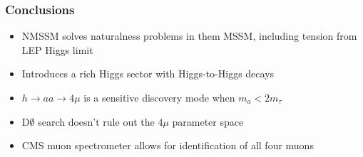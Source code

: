 \documentclass[compress]{beamer}
\begin{document}


\begin{frame}
\frametitle{Conclusions}

\begin{itemize}\setlength{\itemsep}{0.5 cm}
\item NMSSM solves naturalness problems in them MSSM, including tension from LEP Higgs limit
\item Introduces a rich Higgs sector with Higgs-to-Higgs decays
\item $h \to aa \to 4\mu$ is a sensitive discovery mode when $m_a < 2m_\tau$
\item D$\emptyset$ search doesn't rule out the $4\mu$ parameter space
\item CMS muon spectrometer allows for identification of all four muons
\end{itemize}

\label{numpages}
\end{frame}
\end{document}
